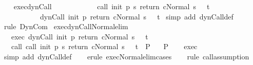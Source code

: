 \begin{isabellebody}
\ \ \isamarkupfalse%
%
\endisatagproof
{\isafoldproof}%
%
\isadelimproof
\isanewline
%
\endisadelimproof
\isanewline
\isanewline
{}\isamarkupfalse%
\ exec{\isacharunderscore}dynCall{\isacharcolon}\ \ \isanewline
\ \ \ \ \ \ \ \ \ \ {\isachardoublequoteopen}{\isasymlbrakk}{\isasymGamma}{\isasymturnstile}{\isasymlangle}call\ init\ {\isacharparenleft}p\ s{\isacharparenright}\ return\ c{\isacharcomma}Normal\ s{\isasymrangle}\ {\isasymRightarrow}\ \ t{\isasymrbrakk}\ \isanewline
\ \ \ \ \ \ \ \ \ \ \ {\isasymLongrightarrow}\ \isanewline
\ \ \ \ \ \ \ \ \ \ \ {\isasymGamma}{\isasymturnstile}{\isasymlangle}dynCall\ init\ p\ return\ c{\isacharcomma}Normal\ s{\isasymrangle}\ {\isasymRightarrow}\ \ t{\isachardoublequoteclose}\isanewline
%
\isadelimproof
%
\endisadelimproof
%
\isatagproof
{}\isamarkupfalse%
\ {\isacharparenleft}simp\ add{\isacharcolon}\ dynCall{\isacharunderscore}def{\isacharparenright}\isanewline
{}\isamarkupfalse%
\ {\isacharparenleft}rule\ DynCom{\isacharparenright}%
\endisatagproof
{\isafoldproof}%
%
\isadelimproof
\isanewline
%
\endisadelimproof
\isanewline
{}\isamarkupfalse%
\ exec{\isacharunderscore}dynCall{\isacharunderscore}Normal{\isacharunderscore}elim{\isacharcolon}\isanewline
\ \ \ exec{\isacharcolon}\ {\isachardoublequoteopen}{\isasymGamma}{\isasymturnstile}{\isasymlangle}dynCall\ init\ p\ return\ c{\isacharcomma}Normal\ s{\isasymrangle}\ {\isasymRightarrow}\ \ t{\isachardoublequoteclose}\isanewline
\ \ \ call{\isacharcolon}\ {\isachardoublequoteopen}{\isasymGamma}{\isasymturnstile}{\isasymlangle}call\ init\ {\isacharparenleft}p\ s{\isacharparenright}\ return\ c{\isacharcomma}Normal\ s{\isasymrangle}\ {\isasymRightarrow}\ \ t\ {\isasymLongrightarrow}\ P{\isachardoublequoteclose}\isanewline
\ \ \ {\isachardoublequoteopen}P{\isachardoublequoteclose}\isanewline
%
\isadelimproof
\ \ %
\endisadelimproof
%
\isatagproof
{}\isamarkupfalse%
\ exec\isanewline
\ \ \isamarkupfalse%
\ {\isacharparenleft}simp\ add{\isacharcolon}\ dynCall{\isacharunderscore}def{\isacharparenright}\isanewline
\ \ \isamarkupfalse%
\ {\isacharparenleft}erule\ exec{\isacharunderscore}Normal{\isacharunderscore}elim{\isacharunderscore}cases{\isacharparenright}\isanewline
\ \ \isamarkupfalse%
\ {\isacharparenleft}rule\ call{\isacharcomma}assumption{\isacharparenright}\isanewline
\ \ \isamarkupfalse%
%
\endisatagproof
{\isafoldproof}%
%
\isadelimproof
\isanewline

\end{isabellebody}
